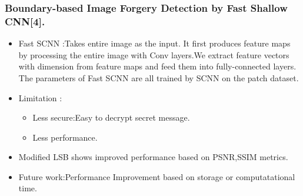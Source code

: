 \documentclass{beamer} %
\theoremstyle{definition} %
\begin{document}
\begin{frame}
 \frametitle{Boundary-based Image Forgery Detection by Fast Shallow CNN[4]. }
 \begin{itemize}
       \item{Fast SCNN :Takes entire image as the input.
			It first produces feature maps by processing the entire image
			with Conv layers.We extract feature vectors with dimension from feature maps and feed them into fully-connected layers.
			The parameters of Fast SCNN are all trained by SCNN on
			the patch dataset. }
		
	\end{itemize}
\begin{itemize}
	\item{Limitation :}
	\begin{itemize}
		\item {Less secure:Easy to decrypt secret message.}
		\item {Less performance.}
	\end{itemize}
	\item{Modified LSB shows improved performance based on PSNR,SSIM metrics.} 
	\item{Future work:Performance Improvement based on storage or computatational time.}
\end{itemize}
\end{frame}
\end{document}
